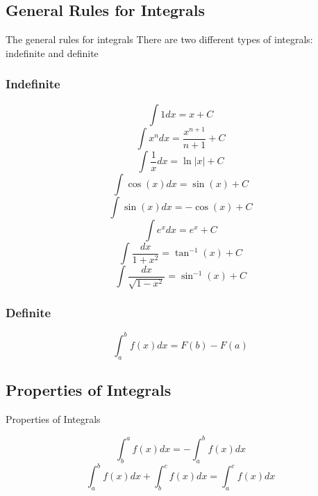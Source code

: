 \documentclass[letterpaper,10pt,twoside,twocolumn,openany]{book}
\begin{document}
\subsection{General Rules for Integrals}
\begin{DndSidebar}{The general rules for integrals}
    There are two different types of integrals: indefinite and definite
    \subsubsection{Indefinite}
        \begin{equation}
            \int 1 dx = x + C
        \end{equation}
        \begin{equation}
            \int x^n dx = \frac{x^{n+1}}{n+1} + C
        \end{equation}
        \begin{equation}
            \int \frac{1}{x} dx = \ln |x| + C
        \end{equation}
        \begin{equation}
            \int \cos(x) dx = \sin (x) + C
        \end{equation}
        \begin{equation}
            \int \sin(x) dx = -\cos(x) + C
        \end{equation}
        \begin{equation}
            \int e^x dx = e^x + C
        \end{equation}
        \begin{equation}
            \int \frac{dx}{1+x^2} = \tan^{-1}(x) + C
        \end{equation}
        \begin{equation}
            \int \frac{dx}{\sqrt{1-x^2}} = \sin^{-1}(x) + C
        \end{equation}



    \subsubsection{Definite}
        \begin{equation}
            \int_a^b f(x) dx = F(b) - F(a)
        \end{equation}
\end{DndSidebar}

\subsection{Properties of Integrals}
\begin{DndSidebar}[]{Properties of Integrals}
    
    \begin{equation}
        \int_b^a f(x)dx = -\int_a^b f(x)dx
    \end{equation}
    \begin{equation}
        \int_a^b f(x) dx + \int_b^c f(x) dx = \int_a^c f(x) dx
    \end{equation}
\end{DndSidebar}
\end{document}
